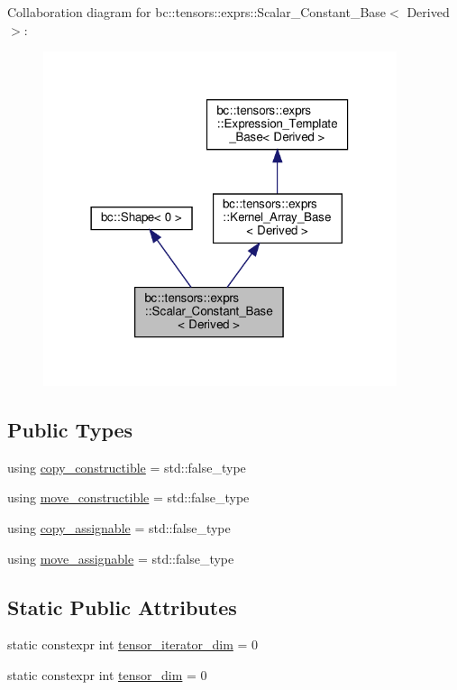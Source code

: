 Collaboration diagram for bc\+:\+:tensors\+:\+:exprs\+:\+:Scalar\+\_\+\+Constant\+\_\+\+Base$<$ Derived $>$\+:\nopagebreak
\begin{figure}[H]
\begin{center}
\leavevmode
\includegraphics[width=294pt]{structbc_1_1tensors_1_1exprs_1_1Scalar__Constant__Base__coll__graph}
\end{center}
\end{figure}
\subsection*{Public Types}
\begin{DoxyCompactItemize}
\item 
using \hyperlink{structbc_1_1tensors_1_1exprs_1_1Scalar__Constant__Base_a1ee2abab850baa05c97c6a7144b5d9b2}{copy\+\_\+constructible} = std\+::false\+\_\+type
\item 
using \hyperlink{structbc_1_1tensors_1_1exprs_1_1Scalar__Constant__Base_a076a0ba824e0cb72d38495a97796119b}{move\+\_\+constructible} = std\+::false\+\_\+type
\item 
using \hyperlink{structbc_1_1tensors_1_1exprs_1_1Scalar__Constant__Base_a5d617c0b0c3be101e65f4a7096637047}{copy\+\_\+assignable} = std\+::false\+\_\+type
\item 
using \hyperlink{structbc_1_1tensors_1_1exprs_1_1Scalar__Constant__Base_a1c93145ae140fd6047e9e56c2817ec12}{move\+\_\+assignable} = std\+::false\+\_\+type
\end{DoxyCompactItemize}
\subsection*{Static Public Attributes}
\begin{DoxyCompactItemize}
\item 
static constexpr int \hyperlink{structbc_1_1tensors_1_1exprs_1_1Scalar__Constant__Base_ad45151f730e8c2730fab11c97f902c73}{tensor\+\_\+iterator\+\_\+dim} = 0
\item 
static constexpr int \hyperlink{structbc_1_1tensors_1_1exprs_1_1Scalar__Constant__Base_a911ae1c7285826b5915f0715cbd9230b}{tensor\+\_\+dim} = 0
\end{DoxyCompactItemize}
